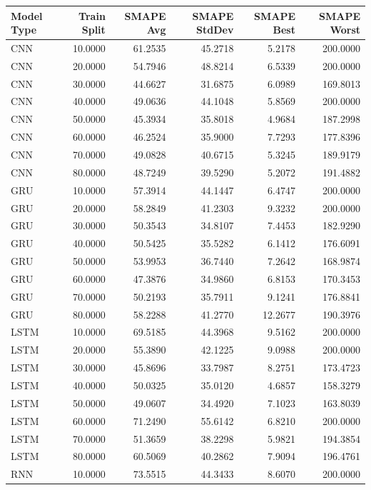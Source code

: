 \begin{tabular}{lrrrrr}
\toprule
Model Type & Train Split & SMAPE Avg & SMAPE StdDev & SMAPE Best & SMAPE Worst \\
\midrule
CNN & 10.0000 & 61.2535 & 45.2718 & 5.2178 & 200.0000 \\
CNN & 20.0000 & 54.7946 & 48.8214 & 6.5339 & 200.0000 \\
CNN & 30.0000 & 44.6627 & 31.6875 & 6.0989 & 169.8013 \\
CNN & 40.0000 & 49.0636 & 44.1048 & 5.8569 & 200.0000 \\
CNN & 50.0000 & 45.3934 & 35.8018 & 4.9684 & 187.2998 \\
CNN & 60.0000 & 46.2524 & 35.9000 & 7.7293 & 177.8396 \\
CNN & 70.0000 & 49.0828 & 40.6715 & 5.3245 & 189.9179 \\
CNN & 80.0000 & 48.7249 & 39.5290 & 5.2072 & 191.4882 \\
GRU & 10.0000 & 57.3914 & 44.1447 & 6.4747 & 200.0000 \\
GRU & 20.0000 & 58.2849 & 41.2303 & 9.3232 & 200.0000 \\
GRU & 30.0000 & 50.3543 & 34.8107 & 7.4453 & 182.9290 \\
GRU & 40.0000 & 50.5425 & 35.5282 & 6.1412 & 176.6091 \\
GRU & 50.0000 & 53.9953 & 36.7440 & 7.2642 & 168.9874 \\
GRU & 60.0000 & 47.3876 & 34.9860 & 6.8153 & 170.3453 \\
GRU & 70.0000 & 50.2193 & 35.7911 & 9.1241 & 176.8841 \\
GRU & 80.0000 & 58.2288 & 41.2770 & 12.2677 & 190.3976 \\
LSTM & 10.0000 & 69.5185 & 44.3968 & 9.5162 & 200.0000 \\
LSTM & 20.0000 & 55.3890 & 42.1225 & 9.0988 & 200.0000 \\
LSTM & 30.0000 & 45.8696 & 33.7987 & 8.2751 & 173.4723 \\
LSTM & 40.0000 & 50.0325 & 35.0120 & 4.6857 & 158.3279 \\
LSTM & 50.0000 & 49.0607 & 34.4920 & 7.1023 & 163.8039 \\
LSTM & 60.0000 & 71.2490 & 55.6142 & 6.8210 & 200.0000 \\
LSTM & 70.0000 & 51.3659 & 38.2298 & 5.9821 & 194.3854 \\
LSTM & 80.0000 & 60.5069 & 40.2862 & 7.9094 & 196.4761 \\
RNN & 10.0000 & 73.5515 & 44.3433 & 8.6070 & 200.0000 \\

\end{tabular}
